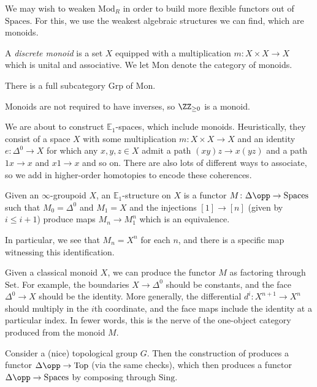 \documentclass[../notes.tex]{subfiles}
\begin{document}
We may wish to weaken $\mathrm{Mod}_R$ in order to build more flexible functors out of $\mathrm{Spaces}$. For this, we use the weakest algebraic structures we can find, which are monoids.
\begin{definition}
	A \textit{discrete monoid} is a set $X$ equipped with a multiplication $m\colon X\times X\to X$ which is unital and associative. We let $\mathrm{Mon}$ denote the category of monoids.
\end{definition}
\begin{example}
	There is a full subcategory $\mathrm{Grp}$ of $\mathrm{Mon}$.
\end{example}
\begin{example}
	Monoids are not required to have inverses, so $\ZZ_{\ge0}$ is a monoid.
\end{example}
We are about to construct $\mathbb E_1$-spaces, which include monoids. Heuristically, they consist of a space $X$ with some multiplication $m\colon X\times X\to X$ and an identity $e\colon\Delta^0\to X$ for which any $x,y,z\in X$ admit a path $(xy)z\to x(yz)$ and a path $1x\to x$ and $x1\to x$ and so on. There are also lots of different ways to associate, so we add in higher-order homotopies to encode these coherences.
\begin{defihelper} 
	Given an $\infty$-groupoid $X$, an $\mathbb E_1$-structure on $X$ is a functor $M\colon\Delta\opp\to\mathrm{Spaces}$ such that $M_0=\Delta^0$ and $M_1=X$ and the injections $[1]\to[n]$ (given by $i\le i+1$) produce maps $M_n\to M_1^n$ which is an equivalence.
\end{defihelper}
\begin{remark}
	In particular, we see that $M_n=X^n$ for each $n$, and there is a specific map witnessing this identification.
\end{remark}
\begin{example} \label{ex:classical-monoid-to-e-1}
	Given a classical monoid $X$, we can produce the functor $M$ as factoring through $\mathrm{Set}$. For example, the boundaries $X\to\Delta^0$ should be constants, and the face $\Delta^0\to X$ should be the identity. More generally, the differential $d^i\colon X^{n+1}\to X^n$ should multiply in the $i$th coordinate, and the face maps include the identity at a particular index. In fewer words, this is the nerve of the one-object category produced from the monoid $M$.
\end{example}
\begin{example} \label{ex:top-group-is-e1}
	Consider a (nice) topological group $G$. Then the construction of  produces a functor $\Delta\opp\to\mathrm{Top}$ (via the same checks), which then produces a functor $\Delta\opp\to\mathrm{Spaces}$ by composing through $\mathrm{Sing}$.
\end{example}
\end{document}
